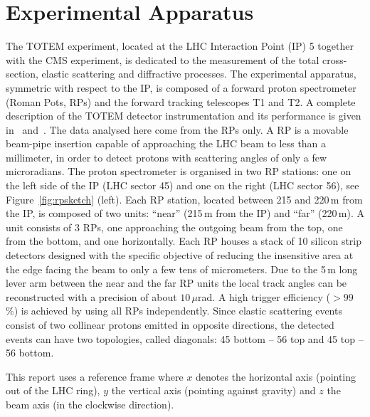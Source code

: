 \section{Experimental Apparatus}
\label{sec:exp apparatus}

The TOTEM experiment, located at the LHC Interaction Point (IP) 5 together with
the CMS experiment, is dedicated to the measurement of the total 
cross-section, elastic scattering
and diffractive processes. The experimental
apparatus, symmetric with respect to the IP, is 
composed of a forward proton spectrometer (Roman Pots, RPs) and the 
forward tracking telescopes T1 and T2. 
A complete description of the TOTEM detector instrumentation 
and its performance is given in~\cite{totem-jinst} and~\cite{totem-ijmp}. 
The data analysed here come from the RPs only. A RP is a movable beam-pipe
insertion capable of approaching the LHC beam to less than a millimeter, in 
order to detect protons with scattering angles of only a few microradians. 
The proton spectrometer is organised in two RP stations: one on the left side of the IP 
(LHC sector 45) and one on the right (LHC sector 56), see Figure~\ref{fig:rpsketch} (left).
Each RP station, located between 215 and 220\,m from the IP, is composed of two 
units: ``near'' (215\,m from the IP) and ``far'' (220\,m). 
A unit consists of 3 RPs, one
approaching the outgoing beam from the top, one from the bottom, and one 
horizontally.
Each RP houses a stack of 10 silicon
strip detectors designed with the specific objective of
reducing the insensitive area at the edge facing the beam
to only a few tens of micrometers. Due to the 5\,m long lever arm 
between the near and the far RP units 
the local track angles can be reconstructed
with a precision of about $10\,\mu$rad. A high trigger efficiency
($> 99$\%) is achieved by using all RPs independently. 
Since elastic scattering events consist of two collinear protons emitted in 
opposite directions, the detected events can have two topologies, called 
diagonals: 45 bottom -- 56 top and 45 top -- 56 bottom.

This report uses a reference frame where $x$ denotes the horizontal axis (pointing out of the LHC ring), $y$ the vertical axis (pointing against gravity) and $z$ the beam axis (in the clockwise direction).


